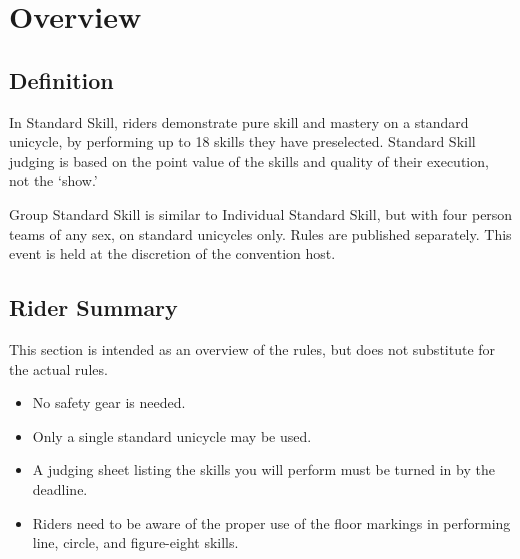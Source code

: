 \chapter{Overview}

\section{Definition}

In Standard Skill, riders demonstrate pure skill and mastery on a standard unicycle, by performing up to 18 skills they have preselected.
Standard Skill judging is based on the point value of the skills and quality of their execution, not the `show.'

Group Standard Skill is similar to Individual Standard Skill, but with four person teams of any sex, on standard unicycles only.
Rules are published separately.
This event is held at the discretion of the convention host.

\section{Rider Summary}

This section is intended as an overview of the rules, but does not
substitute for the actual rules.
\begin{itemize}
\item No safety gear is needed.
\item Only a single standard unicycle may be used.
\item A judging sheet listing the skills you will perform must be turned
in by the deadline.
\item Riders need to be aware of the proper use of the floor markings in 
performing line, circle, and figure-eight skills.
\end{itemize}
